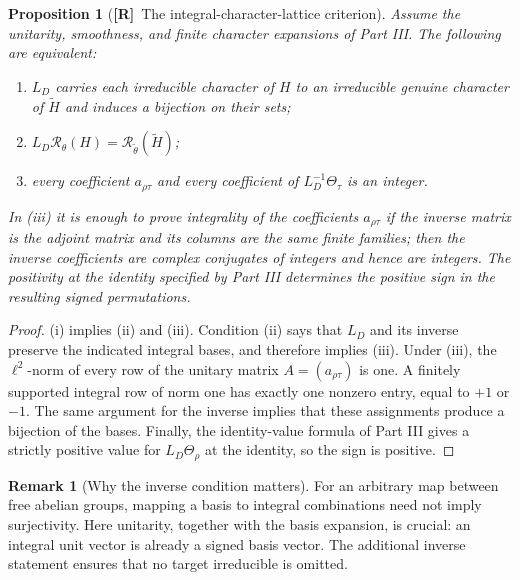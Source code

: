 \documentclass[11pt]{article}
\newcommand{\Rtag}{\textnormal{\textbf{[R]}}}
\theoremstyle{plain}
\newtheorem{proposition}[theorem]{Proposition}
\theoremstyle{definition}
\newtheorem{remark}[theorem]{Remark}
\begin{document}
\begin{proposition}[\Rtag\ The integral-character-lattice criterion]\label{prop:lattice}
Assume the unitarity, smoothness, and finite character expansions of
Part III.  The following are equivalent:
\begin{enumerate}[label=(\roman*)]
 \item $L_D$ carries each irreducible character of $H$ to an
 irreducible genuine character of $\widetilde H$ and induces a bijection
 on their sets;
 \item $L_D\mathcal R_\theta(H)=
 \mathcal R_{\widetilde\theta}(\widetilde H)$;
 \item every coefficient $a_{\rho\tau}$ and every coefficient of
 $L_D^{-1}\Theta_\tau$ is an integer.
\end{enumerate}
In (iii) it is enough to prove integrality of the coefficients
$a_{\rho\tau}$ if the inverse matrix is the adjoint matrix and its
columns are the same finite families; then the inverse coefficients are
complex conjugates of integers and hence are integers.
The positivity at the identity specified by Part III determines the
positive sign in the resulting signed permutations.
\end{proposition}
\begin{proof}
(i) implies (ii) and (iii).  Condition (ii) says that $L_D$ and its
inverse preserve the indicated integral bases, and therefore implies
(iii).  Under (iii), the $\ell^2$-norm of every row of the unitary
matrix $A=(a_{\rho\tau})$ is one.  A finitely supported integral row
of norm one has exactly one nonzero entry, equal to $+1$ or $-1$.
The same argument for the inverse implies that these assignments
produce a bijection of the bases.  Finally, the identity-value formula
of Part III gives a strictly positive value for
$L_D\Theta_\rho$ at the identity, so the sign is positive.
\end{proof}

\begin{remark}[Why the inverse condition matters]
For an arbitrary map between free abelian groups, mapping a basis to
integral combinations need not imply surjectivity.  Here unitarity,
together with the basis expansion, is crucial: an integral unit vector
is already a signed basis vector.  The additional inverse statement
ensures that no target irreducible is omitted.
\end{remark}
\end{document}
